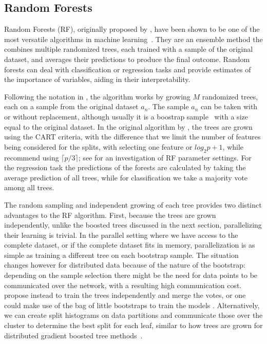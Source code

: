 \subsection{Random Forests}
\label{sec:bg-dt-random-forests}

Random Forests (RF), originally proposed by \citet{random-forests}, have been shown to be one of the
most versatile algorithms in machine learning~\cite{hundreds-classifiers}. They are an
ensemble method the combines multiple randomized trees, each trained with a sample
of the original dataset, and averages their predictions to produce the final outcome.
Random forests can deal with classification or regression tasks and provide estimates
of the importance of variables, aiding in their interpretability.

Following the notation in \cite{random-forest-survey}, the algorithm works by growing
$M$ randomized trees, each on a sample from the original dataset $a_n$. The sample
$a_n$ can be taken with or without replacement, although usually it is a boostrap
sample~\cite{bootstrap} with a size equal to the original dataset. In the original
algorithm by \citeauthor{random-forests}, the trees are grown using the CART criteria,
with the difference that we limit the number of features being
considered for the splits, with \citeauthor{random-forests} selecting one feature or
$log_2{p} + 1$, while \citeauthor{random-forest-survey} recommend using $\lceil p/3 \rceil$;
see \cite{rf-parameters} for an investigation of RF parameter settings.
For the regression task the predictions of the forests are calculated
by taking the average prediction of all trees, while for classification
we take a majority vote among all trees.

The random sampling and independent growing of each tree provides two distinct advantages
to the RF algorithm. First, because the trees are grown independently, unlike the boosted trees
discussed in the next section, parallelizing their learning is trivial. In the parallel
setting where we have access to the complete dataset, or if the complete dataset
fits in memory, parallelization is as simple as training a different tree on
each bootstrap sample. The situation changes
however for distributed data because of the nature of the bootstrap: depending
on the sample selection there might be the need for data points to be communicated
over the network, with a resulting high communication cost.
\citet{ensembles-bites} propose instead to train the trees independently
and merge the votes, or one could make use of the bag of little bootstraps
to train the models \cite{bag-of-boostraps}. Alternatively, we can create split
histograms on data partitions and communicate those over the cluster to determine the
best split for each leaf, similar to how trees are grown for distributed
gradient boosted tree methods~\cite{xgboost, lightgbm}.

